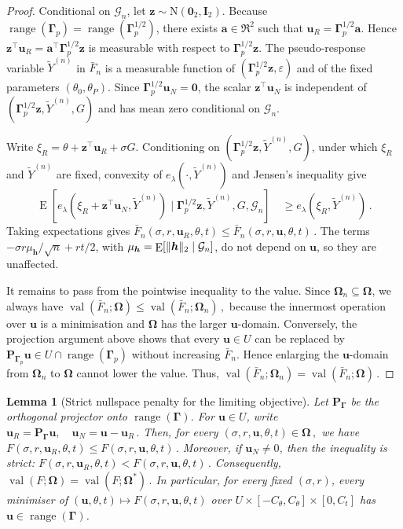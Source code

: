 \documentclass{article}
\makeatletter
\DeclareMathOperator{\expect}{E}
\newtheorem{lemma}{Lemma}
\theoremstyle{definition}
\newcommand{\vnorm}[1]{%
	\ensuremath{%
		\if@display
		\left\| #1 \right\|
		\else
		\| #1 \|
		\fi
	}%
}
\newcommand*{\bb}{\boldsymbol}
\def\bu{\bb{u}}
\def\bh{\bb{h}}
\def\Ytil{\widetilde{Y}}
\def\bz{\bb{z}}
\newcommand{\range}{\operatorname{range}}
\makeatother
\begin{document}
\begin{bibunit}
\begin{proof}
	Conditional on $\mathcal G_n$, let $\bz\sim\mathrm N(\bb0_2,\bb I_2)$.
	Because
	$\range(\bb\Gamma_p)=\range(\bb\Gamma_p^{1/2})$, there exists
	$\bb a\in\Re^2$ such that
	$\bu_R=\bb\Gamma_p^{1/2}\bb a$. Hence
	$\bz^\top\bu_R=\bb a^\top\bb\Gamma_p^{1/2}\bz$ is measurable with respect to
	$\bb\Gamma_p^{1/2}\bz$.
	The pseudo-response variable $\Ytil^{(n)}$ in $\bar F_n$ is a measurable function of $(\bb\Gamma_p^{1/2}\bz,\varepsilon)$ and of the fixed parameters $(\theta_0,\theta_P)$. Since $\bb\Gamma_p^{1/2}\bu_N=\bb0$, the scalar $\bz^\top\bu_N$ is independent of $(\bb\Gamma_p^{1/2}\bz,\Ytil^{(n)},G)$ and has mean zero conditional on $\mathcal G_n$.

		Write $\xi_R=\theta+\bz^\top\bu_R+\sigma G$. Conditioning on
	$(\bb\Gamma_p^{1/2}\bz,\Ytil^{(n)},G)$, under which $\xi_R$ and $\Ytil^{(n)}$ are fixed, convexity of $e_\lambda(\cdot,\Ytil^{(n)})$ and Jensen's inequality \citep[Chapter~2.7]{shiryaev:2016} give
	$$
		\expect\left[ e_\lambda \left( \xi_R+\bz^\top\bu_N,\Ytil^{(n)} \right) \mid \bb\Gamma_p^{1/2}\bz,\Ytil^{(n)},G,\mathcal G_n \right] \quad\geq e_\lambda \left( \xi_R,\Ytil^{(n)} \right)\,.
	$$
		Taking expectations gives $\bar F_n(\sigma,r,\bu_R,\theta,t) \leq \bar F_n(\sigma,r,\bu,\theta,t)\,.$
		The terms $-\sigma r\mu_{\bh}/\sqrt n+rt/2$, with $\mu_{\bh} = \expect[\vnorm{\bh}_2 \mid \mathcal G_n]$,
		do not depend on $\bu$, so they are unaffected.

		It remains to pass from the pointwise inequality to the value. Since $\bb\Omega_n\subseteq\bb\Omega$, we always have $\operatorname{val}(\bar F_n;\bb\Omega) \leq \operatorname{val}(\bar F_n;\bb\Omega_n)\,,$
		because the innermost operation over $\bu$ is a minimisation and $\bb\Omega$ has the larger $\bu$-domain. Conversely, the projection argument above shows that every $\bu\in U$ can be replaced by $\bb P_{\bb \Gamma_p}\bu\in U\cap\range(\bb\Gamma_p)$ without increasing $\bar F_n$. Hence enlarging the $\bu$-domain from $\bb\Omega_n$ to $\bb\Omega$ cannot lower the value. Thus,
		$\operatorname{val}(\bar F_n;\bb\Omega_n) = \operatorname{val}(\bar F_n;\bb\Omega)\,.$
	\end{proof}

	\begin{lemma}[Strict nullspace penalty for the limiting objective]
	\label{lemma:nullspace_no_help_F}
		Let $\bb P_{\bb \Gamma}$ be the orthogonal projector onto $\range(\bb\Gamma)$.
		For $\bu\in U$, write $\bu_R=\bb P_{\bb \Gamma}\bu, \quad \bu_N=\bu-\bu_R\,.$
		Then, for every $(\sigma,r,\bu,\theta,t)\in\bb\Omega\,,$
		we have $F(\sigma,r,\bu_R,\theta,t) \leq F(\sigma,r,\bu,\theta,t)\,.$
		Moreover, if $\bu_N\neq0$, then the inequality is strict: $F(\sigma,r,\bu_R,\theta,t) < F(\sigma,r,\bu,\theta,t)\,.$
		Consequently, $\operatorname{val}(F;\bb\Omega) = \operatorname{val}(F;\bb\Omega^*)\,.$
		In particular, for every fixed $(\sigma,r)$, every minimiser of $(\bu,\theta,t) \mapsto F(\sigma,r,\bu,\theta,t)$
		over $U\times[-C_\theta,C_\theta]\times[0,C_t]$
		has $\bu\in\range(\bb\Gamma)$.
	\end{lemma}


\end{bibunit}
\end{document}
